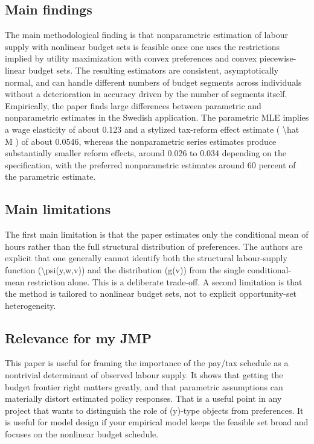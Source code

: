 \documentclass[11pt,a4paper]{article}
\begin{document}
\subsection*{Main findings}
The main methodological finding is that nonparametric estimation of labour supply with nonlinear budget sets is feasible once one uses the restrictions implied by utility maximization with convex preferences and convex piecewise-linear budget sets. The resulting estimators are consistent, asymptotically normal, and can handle different numbers of budget segments across individuals without a deterioration in accuracy driven by the number of segments itself. Empirically, the paper finds large differences between parametric and nonparametric estimates in the Swedish application. The parametric MLE implies a wage elasticity of about 0.123 and a stylized tax-reform effect estimate ( \textbackslash{}hat M ) of about 0.0546, whereas the nonparametric series estimates produce substantially smaller reform effects, around 0.026 to 0.034 depending on the specification, with the preferred nonparametric estimates around 60 percent of the parametric estimate.

\subsection*{Main limitations}
The first main limitation is that the paper estimates only the conditional mean of hours rather than the full structural distribution of preferences. The authors are explicit that one generally cannot identify both the structural labour-supply function (\textbackslash{}psi(y,w,v)) and the distribution (g(v)) from the single conditional-mean restriction alone. This is a deliberate trade-off. A second limitation is that the method is tailored to nonlinear budget sets, not to explicit opportunity-set heterogeneity.

\subsection*{Relevance for my JMP}
This paper is useful for framing the importance of the pay/tax schedule as a nontrivial determinant of observed labour supply. It shows that getting the budget frontier right matters greatly, and that parametric assumptions can materially distort estimated policy responses. That is a useful point in any project that wants to distinguish the role of (y)-type objects from preferences. It is useful for model design if your empirical model keeps the feasible set broad and focuses on the nonlinear budget schedule.
\end{document}
